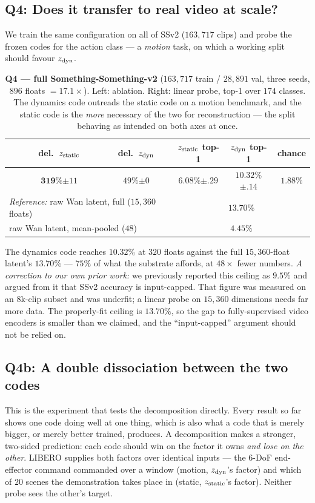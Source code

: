 \subsection{Q4: Does it transfer to real video at scale?}
\label{sec:q4}
We train the same configuration on all of SSv2 ($163{,}717$ clips) and probe the frozen
codes for the action class --- a \emph{motion} task, on which a working split should
favour $z_{\mathrm{dyn}}$.

\begin{table}[t]
\centering\small
\caption{\textbf{Q4 --- full Something-Something-v2} ($163{,}717$ train / $28{,}891$ val,
three seeds, $896$ floats $=17.1\times$). Left: ablation. Right: linear probe, top-1 over
$174$ classes. The dynamics code outreads the static code on a motion benchmark, and the
static code is the \emph{more} necessary of the two for reconstruction --- the split
behaving as intended on both axes at once.}
\label{tab:ssv2}
\begin{tabular}{lcc|ccc}
\toprule
& del.\ $z_{\mathrm{static}}$ & del.\ $z_{\mathrm{dyn}}$ & $z_{\mathrm{static}}$ top-1 & $z_{\mathrm{dyn}}$ top-1 & chance \\
\midrule
\textbf{\method{}} & $\mathbf{319\%}${\tiny$\pm11$} & $49\%${\tiny$\pm0$} & $6.08\%${\tiny$\pm.29$} & $\mathbf{10.32\%}${\tiny$\pm.14$} & $1.88\%$ \\
\midrule
\multicolumn{3}{l}{\emph{Reference:} raw Wan latent, full ($15{,}360$ floats)} & \multicolumn{3}{c}{$13.70\%$} \\
\multicolumn{3}{l}{\phantom{\emph{Reference:}} raw Wan latent, mean-pooled ($48$)} & \multicolumn{3}{c}{$4.45\%$} \\
\bottomrule
\end{tabular}
\end{table}

The dynamics code reaches $10.32\%$ at $320$ floats against the full $15{,}360$-float
latent's $13.70\%$ --- $75\%$ of what the substrate affords, at $48\times$ fewer numbers.
\emph{A correction to our own prior work:} we previously reported this ceiling as
$9.5\%$ and argued from it that SSv2 accuracy is input-capped. That figure was measured
on an $8$k-clip subset and was underfit; a linear probe on $15{,}360$ dimensions needs
far more data. The properly-fit ceiling is $13.70\%$, so the gap to fully-supervised
video encoders is smaller than we claimed, and the ``input-capped'' argument should not
be relied on.

\subsection{Q4b: A double dissociation between the two codes}
\label{sec:libero}
This is the experiment that tests the decomposition directly. Every result so far shows
one code doing well at one thing, which is also what a code that is merely bigger, or
merely better trained, produces. A decomposition makes a stronger, two-sided prediction:
each code should win on the factor it owns \emph{and lose on the other}. LIBERO supplies
both factors over identical inputs --- the $6$-DoF end-effector command commanded over a
window (motion, $z_{\mathrm{dyn}}$'s factor) and which of $20$ scenes the demonstration takes place in
(static, $z_{\mathrm{static}}$'s factor). Neither probe sees the other's target.

